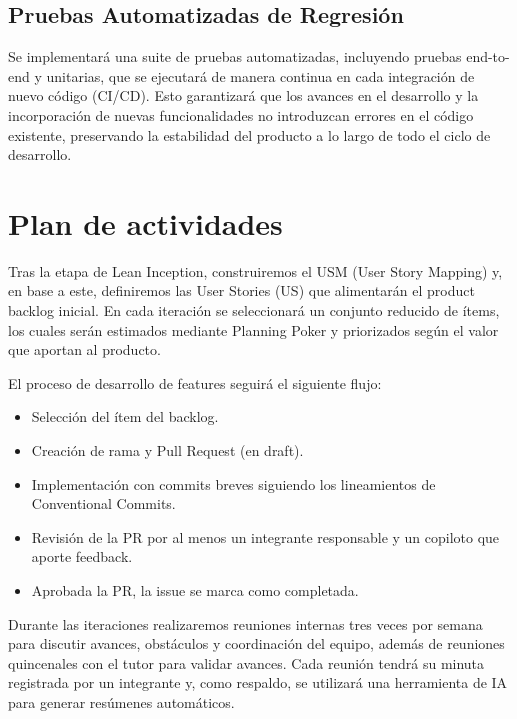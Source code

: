 \subsection{Pruebas Automatizadas de Regresión}

Se implementará una suite de pruebas automatizadas, incluyendo pruebas end-to-end y unitarias, que se ejecutará de manera continua en cada integración de nuevo código (CI/CD).  
Esto garantizará que los avances en el desarrollo y la incorporación de nuevas funcionalidades no introduzcan errores en el código existente,
preservando la estabilidad del producto a lo largo de todo el ciclo de desarrollo.

\section{Plan de actividades}
\label{sec:activity-plan}

Tras la etapa de Lean Inception, construiremos el USM (User Story Mapping) y, en base a este, definiremos las User 
Stories (US) que alimentarán el product backlog inicial. En cada iteración se seleccionará un conjunto reducido de 
ítems, los cuales serán estimados mediante Planning Poker y priorizados según el valor que aportan al producto.
\vspace{0.25cm}

El proceso de desarrollo de features seguirá el siguiente flujo:

\begin{itemize}
    \item Selección del ítem del backlog.
    \item Creación de rama y Pull Request (en draft).
    \item Implementación con commits breves siguiendo los lineamientos de Conventional Commits.
    \item Revisión de la PR por al menos un integrante responsable y un copiloto que aporte feedback.
    \item Aprobada la PR, la issue se marca como completada.
\end{itemize}

\vspace{0.25cm}

Durante las iteraciones realizaremos reuniones internas tres veces por semana para discutir avances, obstáculos y 
coordinación del equipo, además de reuniones quincenales con el tutor para validar avances. Cada reunión tendrá su 
minuta registrada por un integrante y, como respaldo, se utilizará una herramienta de IA para generar resúmenes 
automáticos.

